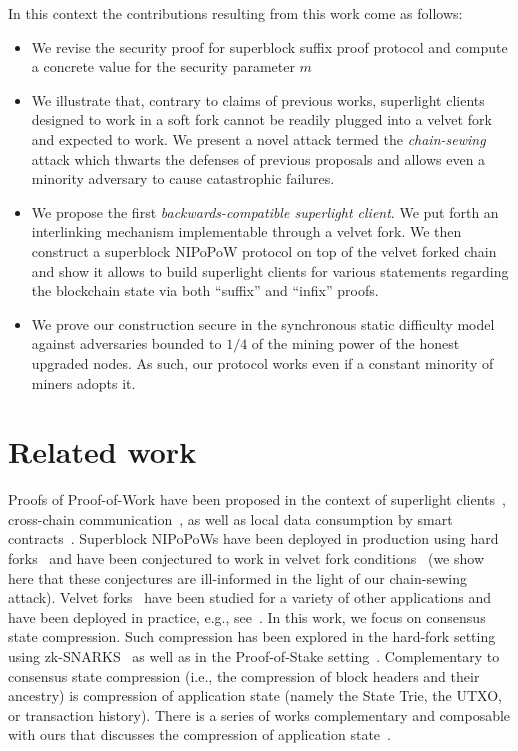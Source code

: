 In this context the contributions resulting from this work come as follows:
\begin{itemize}
	\item We revise the security proof for superblock suffix proof protocol and compute a concrete value for the security parameter $m$
  	\item We illustrate that, contrary to claims of previous works, superlight clients designed to work in a soft fork cannot be readily plugged into a velvet fork and expected to work. We present a novel attack termed the \emph{chain-sewing} attack which thwarts the defenses of previous proposals and allows even a minority adversary to cause catastrophic failures.
	\item We propose the first \emph{backwards-compatible superlight client}. We put forth an interlinking mechanism implementable through a velvet fork. We then construct a superblock NIPoPoW protocol on top of the velvet forked chain and show it allows to build superlight clients for various statements regarding the blockchain state via both ``suffix'' and ``infix'' proofs. 
	\item We prove our construction secure in the synchronous static difficulty model against adversaries bounded to $1/4$ of the mining power of the honest upgraded nodes. As such, our protocol works even if a constant minority of miners adopts it.
\end{itemize}

\section{Related work} 
Proofs of Proof-of-Work have been proposed in the
context of superlight clients~\cite{pow,nipopows,flyclient},
cross-chain communication~\cite{pow-sidechains,burn,crosschain-sok}, as well as
local data consumption by smart contracts~\cite{derivatives}. Superblock
NIPoPoWs have been deployed in production using hard forks~\cite{ergo} and have
been conjectured to work in velvet fork conditions~\cite{nipopows} (we show
here that these conjectures are ill-informed in the light of our chain-sewing
attack). Velvet forks~\cite{velvet} have been studied for a variety of other
applications and have been deployed in practice, e.g., see~\cite{gtklocker}. In this work,
we focus on consensus state compression. Such compression has been explored in
the hard-fork setting using zk-SNARKS~\cite{coda} as well as in the
Proof-of-Stake setting~\cite{pos-sidechains}. Complementary to consensus state
compression (i.e., the compression of block headers and their ancestry) is
compression of application state (namely the State Trie, the UTXO, or
transaction history). There is a series of works complementary and composable with ours that
discusses the compression of application state~\cite{edrax,ethanos}.
